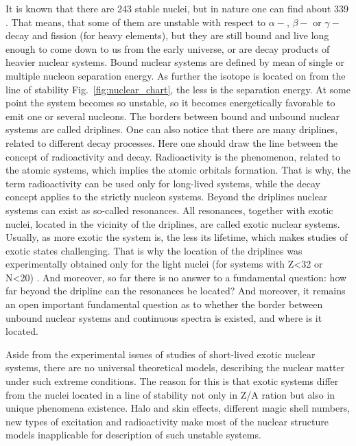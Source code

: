 It is known that there are 243 stable nuclei, but in nature one can find about 339 \cite{Grigorenko:2016}. 
That means, that some of them are unstable with respect to $\alpha-$, $\beta-$ or $\gamma-$decay and fission (for heavy elements), but they are still bound and live long enough to come down to us from the early universe, or are decay products of heavier nuclear systems. 
Bound nuclear systems are defined by mean of single or multiple nucleon separation energy.
As further the isotope is located on from the line of stability Fig.\ \ref{fig:nuclear_chart}, the less is the separation energy.
At some point the system becomes so unstable, so it becomes energetically favorable to emit one or several nucleons.
The borders between bound and unbound nuclear systems are called driplines.
One can also notice that there are many driplines, related to different decay processes.
Here one should draw the line between the concept of radioactivity and decay. 
Radioactivity is the phenomenon, related to the atomic systems, which implies the atomic orbitals formation.
That is why, the term radioactivity can be used only for long-lived systems, while the decay concept applies to the strictly nucleon systems.
Beyond the driplines nuclear systems can exist as so-called resonances. 
All resonances, together with exotic nuclei, located in the vicinity of the driplines, are called exotic nuclear systems.
Usually, as more exotic the system is, the less its lifetime, which makes studies of exotic states challenging. 
That is why the location of the driplines was experimentally obtained only for the light nuclei (for systems with Z<32 or N<20) \cite{GrigorenkoUFN:2019}.
And moreover, so far there is no answer to a fundamental question: how far beyond the dripline can the resonances be located? 
And moreover, it remains an open important fundamental question as to whether the border between unbound nuclear systems and continuous spectra is existed, and where is it located.

Aside from the experimental issues of studies of short-lived exotic nuclear systems, there are no universal theoretical models, describing the nuclear matter under such extreme conditions.
The reason for this is that exotic systems differ from the nuclei located in a line of stability not only in Z/A ration but also in unique phenomena existence.
Halo and skin effects, different magic shell numbers, new types of excitation and radioactivity make most of the nuclear structure models inapplicable for description of such unstable systems.

